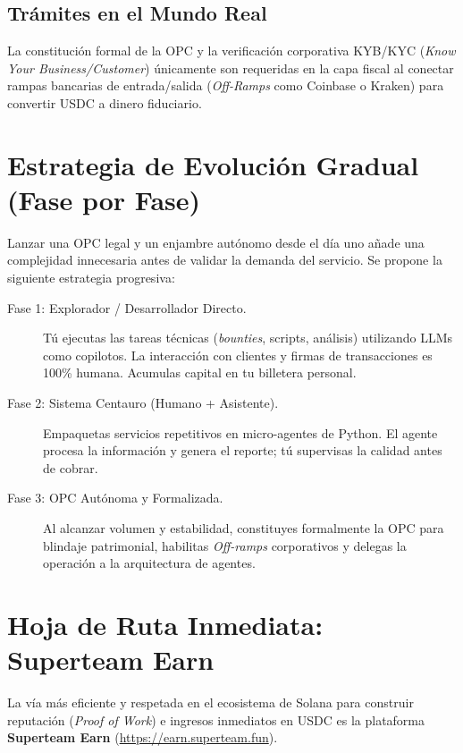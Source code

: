 \documentclass[11pt,a4paper]{article}
\begin{document}
\subsection{Trámites en el Mundo Real}
La constitución formal de la OPC y la verificación corporativa KYB/KYC (\emph{Know Your Business/Customer}) únicamente son requeridas en la capa fiscal al conectar rampas bancarias de entrada/salida (\emph{Off-Ramps} como Coinbase o Kraken) para convertir USDC a dinero fiduciario.

\section{Estrategia de Evolución Gradual (Fase por Fase)}

Lanzar una OPC legal y un enjambre autónomo desde el día uno añade una complejidad innecesaria antes de validar la demanda del servicio. Se propone la siguiente estrategia progresiva:

\begin{description}
    \item[Fase 1: Explorador / Desarrollador Directo.] Tú ejecutas las tareas técnicas (\emph{bounties}, scripts, análisis) utilizando LLMs como copilotos. La interacción con clientes y firmas de transacciones es 100\% humana. Acumulas capital en tu billetera personal.
    \item[Fase 2: Sistema Centauro (Humano + Asistente).] Empaquetas servicios repetitivos en micro-agentes de Python. El agente procesa la información y genera el reporte; tú supervisas la calidad antes de cobrar.
    \item[Fase 3: OPC Autónoma y Formalizada.] Al alcanzar volumen y estabilidad, constituyes formalmente la OPC para blindaje patrimonial, habilitas \emph{Off-ramps} corporativos y delegas la operación a la arquitectura de agentes.
\end{description}

\section{Hoja de Ruta Inmediata: Superteam Earn}

La vía más eficiente y respetada en el ecosistema de Solana para construir reputación (\emph{Proof of Work}) e ingresos inmediatos en USDC es la plataforma \textbf{Superteam Earn} (\url{https://earn.superteam.fun}).
\end{document}
